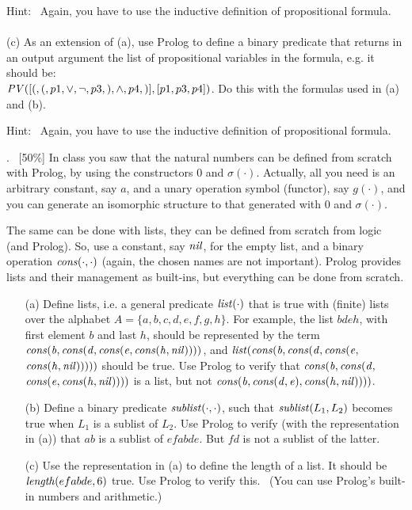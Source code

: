 \documentclass[fullapage,12pt]{article}
\newcommand{\nit}[1]{{\it #1}}
\begin{document}
\vspace{2mm}
\noindent Hint: \ Again, you have to use
the inductive definition of propositional formula.\\
\\
(c) As an extension of (a), use Prolog to define a binary predicate that returns in an output argument the list of propositional variables in the formula, e.g. it should be:\\
$\nit{PV}([(,(,p1,\vee, \neg, p3,), \wedge, p4,)], [p1,p3,p4])$. Do this with the formulas used in (a) and (b).

\vspace{2mm}
\noindent Hint: \ Again, you have to use
the inductive definition of propositional formula. \\

\newpage


. \ [50\%] In class you saw that the natural numbers can be defined from scratch with Prolog, by using the constructors $0$ and $\sigma(\cdot)$. Actually, all you need is an arbitrary constant, say $a$, and a 
unary operation symbol (functor), say $g(\cdot)$, and you can generate an isomorphic structure to that generated with $0$ and $\sigma(\cdot)$.

The same can be done with lists, they can be defined from scratch from logic (and Prolog). So, use a constant, say $\nit{nil}$, for the empty list, and a binary operation $\nit{cons}(\cdot,\cdot)$ (again, the chosen names are not important). Prolog provides lists and their management as built-ins, but everything can be done from scratch. 
\begin{itemize}
\item[(a)]
Define lists, i.e. a general predicate $\nit{list}(\cdot)$ that is true with (finite) lists  over the alphabet $A = \{a,b,c,d,e, f, g, h\}$. For example, the list $bdeh$, with first element $b$ and last $h$, should be represented by the term $\nit{cons(b,cons(d,cons(e,cons(h,nil))))}$, and $\nit{list}(\nit{cons(b,cons(d,cons(e,}$\linebreak $\nit{cons(h,nil))))})$ should be true. Use Prolog to verify that $\nit{cons(b,cons(d,}$ \linebreak $\nit{cons(e,cons(h,nil))))}$ is a list, but not $\nit{cons(b,cons(d,e),cons(h,nil))))}$.

\item[(b)] Define a binary predicate $\nit{sublist}(\cdot,\cdot)$, such  that $\nit{sublist}(L_1,L_2)$ becomes true when $L_1$ is a sublist of $L_2$. Use Prolog to verify (with the representation in (a)) that 
$ab$ is a sublist of $efabde$. But $fd$ is not a sublist of the latter. 

\item[(c)] Use the representation in (a) to define the length of a list. It should be $\nit{length}(efabde,6)$ true. Use Prolog to verify this. \ (You can use Prolog's built-in numbers and arithmetic.)
\end{itemize}
\end{document}
